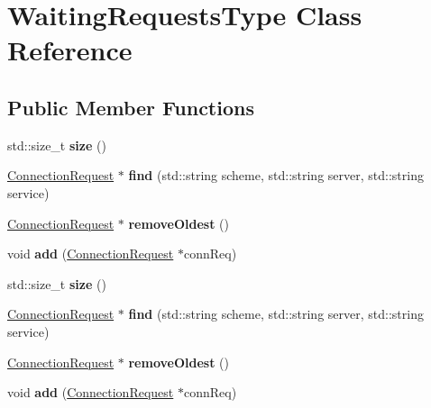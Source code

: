 \hypertarget{class_waiting_requests_type}{}\section{Waiting\+Requests\+Type Class Reference}
\label{class_waiting_requests_type}
\subsection*{Public Member Functions}
\begin{DoxyCompactItemize}
\item 
\mbox{\label{class_waiting_requests_type_a790ddd29bf0e552abf72ce25b45bc922}} 
std\+::size\+\_\+t {\bfseries size} ()
\item 
\mbox{\label{class_waiting_requests_type_a03b3e374d7bfdf7dbd5090e304098120}} 
\hyperlink{class_connection_request}{Connection\+Request} $\ast$ {\bfseries find} (std\+::string scheme, std\+::string server, std\+::string service)
\item 
\mbox{\label{class_waiting_requests_type_a629d54b7847918da2e7343d24cf5e11d}} 
\hyperlink{class_connection_request}{Connection\+Request} $\ast$ {\bfseries remove\+Oldest} ()
\item 
\mbox{\label{class_waiting_requests_type_afb37d267af782b4e03525bd785a6be98}} 
void {\bfseries add} (\hyperlink{class_connection_request}{Connection\+Request} $\ast$conn\+Req)
\item 
\mbox{\label{class_waiting_requests_type_a790ddd29bf0e552abf72ce25b45bc922}} 
std\+::size\+\_\+t {\bfseries size} ()
\item 
\mbox{\label{class_waiting_requests_type_a1891f7c90dc587d550491db111c53c90}} 
\hyperlink{class_connection_request}{Connection\+Request} $\ast$ {\bfseries find} (std\+::string scheme, std\+::string server, std\+::string service)
\item 
\mbox{\label{class_waiting_requests_type_a46aee62e2e9ca030c5c13243cc2d88da}} 
\hyperlink{class_connection_request}{Connection\+Request} $\ast$ {\bfseries remove\+Oldest} ()
\item 
\mbox{\label{class_waiting_requests_type_afb37d267af782b4e03525bd785a6be98}} 
void {\bfseries add} (\hyperlink{class_connection_request}{Connection\+Request} $\ast$conn\+Req)
\end{DoxyCompactItemize}


